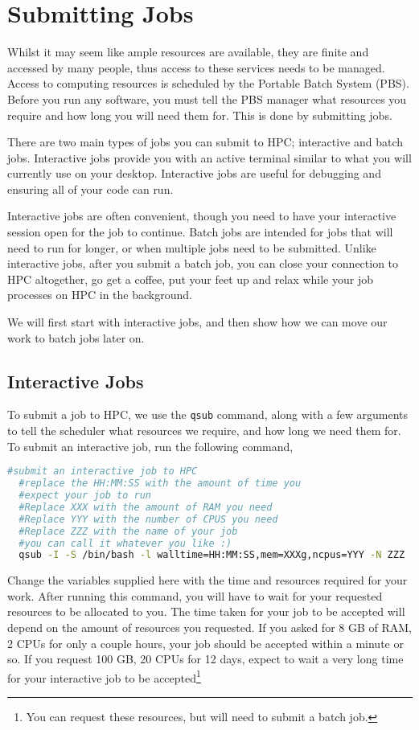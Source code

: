 \section{Submitting Jobs}
% 
% 
%
Whilst it may seem like ample resources are available, they are finite and accessed by many people, thus access to these services needs to be managed. Access to computing resources is scheduled by the Portable Batch System (PBS). Before you run any software, you must tell the PBS manager what resources you require and how long you will need them for. This is done by submitting jobs.
%
%
\par
%
%
There are two main types of jobs you can submit to HPC; interactive and batch jobs. Interactive jobs provide you with an active terminal similar to what you will currently use on your desktop. Interactive jobs are useful for debugging and ensuring all of your code can run.
%
%
\par
%
%
Interactive jobs are often convenient, though you need to have your interactive session open for the job to continue. Batch jobs are intended for jobs that will need to run for longer, or when multiple jobs need to be submitted. Unlike interactive jobs, after you submit a batch job, you can close your connection to HPC altogether, go get a coffee, put your feet up and relax while your job processes on HPC in the background.
%
%
%
\par
We will first start with interactive jobs, and then show how we can move our work to batch jobs later on.
%
%
%
\subsection{Interactive Jobs}
To submit a job to HPC, we use the \texttt{qsub} command, along with a few arguments to tell the scheduler what resources we require, and how long we need them for. To submit an interactive job, run the following command,
\newpage
\begin{lstlisting}[language=bash, frame=single, breaklines=true]
  #submit an interactive job to HPC
  #replace the HH:MM:SS with the amount of time you
  #expect your job to run
  #Replace XXX with the amount of RAM you need
  #Replace YYY with the number of CPUS you need
  #Replace ZZZ with the name of your job
  #you can call it whatever you like :)
  qsub -I -S /bin/bash -l walltime=HH:MM:SS,mem=XXXg,ncpus=YYY -N ZZZ
\end{lstlisting}
%
%
Change the variables supplied here with the time and resources required for your work. After running this command, you will have to wait for your requested resources to be allocated to you. The time taken for your job to be accepted will depend on the amount of resources you requested. If you asked for 8 GB of RAM, 2 CPUs for only a couple hours, your job should be accepted within a minute or so. If you request 100 GB, 20 CPUs for 12 days, expect to wait a very long time for your interactive job to be accepted\footnote{You can request these resources, but will need to submit a batch job.}

